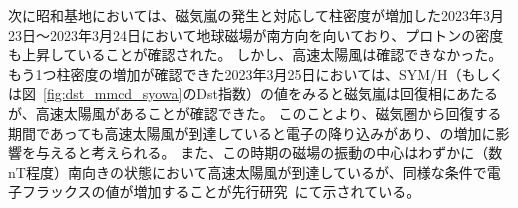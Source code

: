 次に昭和基地においては、磁気嵐の発生と対応して柱密度が増加した2023年3月23日〜2023年3月24日において地球磁場が南方向を向いており、プロトンの密度も上昇していることが確認された。
しかし、高速太陽風は確認できなかった。
もう1つ柱密度の増加が確認できた2023年3月25日においては、SYM/H（もしくは図~\ref{fig:dst_mmcd_syowa}のDst指数）の値をみると磁気嵐は回復相にあたるが、高速太陽風があることが確認できた。
このことより、磁気圏から回復する期間であっても高速太陽風が到達していると電子の降り込みがあり、の増加に影響を与えると考えられる。
また、この時期の磁場の振動の中心はわずかに（数nT程度）南向きの状態において高速太陽風が到達しているが、同様な条件で電子フラックスの値が増加することが先行研究~\cite{miyoshi2013high}にて示されている。
